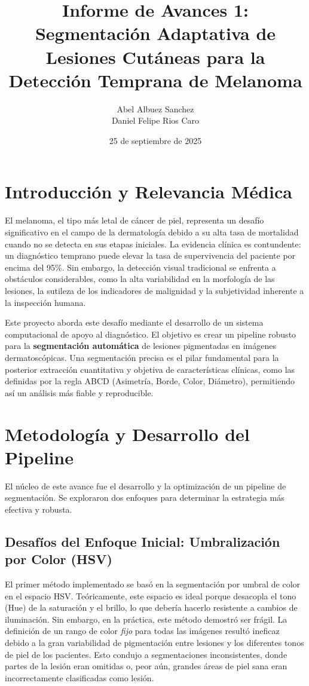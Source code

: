 \documentclass[12pt, a4paper]{article}
\title{\textbf{Informe de Avances 1: Segmentación Adaptativa de Lesiones Cutáneas para la Detección Temprana de Melanoma}}
\author{Abel Albuez Sanchez \\ Daniel Felipe Rios Caro}
\date{25 de septiembre de 2025}
\begin{document}
	
	\maketitle
	\thispagestyle{empty} %
	
	
	\section{Introducción y Relevancia Médica}
	
	El melanoma, el tipo más letal de cáncer de piel, representa un desafío significativo en el campo de la dermatología debido a su alta tasa de mortalidad cuando no se detecta en sus etapas iniciales. La evidencia clínica es contundente: un diagnóstico temprano puede elevar la tasa de supervivencia del paciente por encima del 95\%. Sin embargo, la detección visual tradicional se enfrenta a obstáculos considerables, como la alta variabilidad en la morfología de las lesiones, la sutileza de los indicadores de malignidad y la subjetividad inherente a la inspección humana.
	
	Este proyecto aborda este desafío mediante el desarrollo de un sistema computacional de apoyo al diagnóstico. El objetivo es crear un pipeline robusto para la \textbf{segmentación automática} de lesiones pigmentadas en imágenes dermatoscópicas. Una segmentación precisa es el pilar fundamental para la posterior extracción cuantitativa y objetiva de características clínicas, como las definidas por la regla ABCD (Asimetría, Borde, Color, Diámetro), permitiendo así un análisis más fiable y reproducible.
	
	\section{Metodología y Desarrollo del Pipeline}
	
	El núcleo de este avance fue el desarrollo y la optimización de un pipeline de segmentación. Se exploraron dos enfoques para determinar la estrategia más efectiva y robusta.
	
	\subsection{Desafíos del Enfoque Inicial: Umbralización por Color (HSV)}
	
	El primer método implementado se basó en la segmentación por umbral de color en el espacio HSV. Teóricamente, este espacio es ideal porque desacopla el tono (Hue) de la saturación y el brillo, lo que debería hacerlo resistente a cambios de iluminación. Sin embargo, en la práctica, este método demostró ser frágil. La definición de un rango de color \textit{fijo} para todas las imágenes resultó ineficaz debido a la gran variabilidad de pigmentación entre lesiones y los diferentes tonos de piel de los pacientes. Esto condujo a segmentaciones inconsistentes, donde partes de la lesión eran omitidas o, peor aún, grandes áreas de piel sana eran incorrectamente clasificadas como lesión.
	
\end{document}
